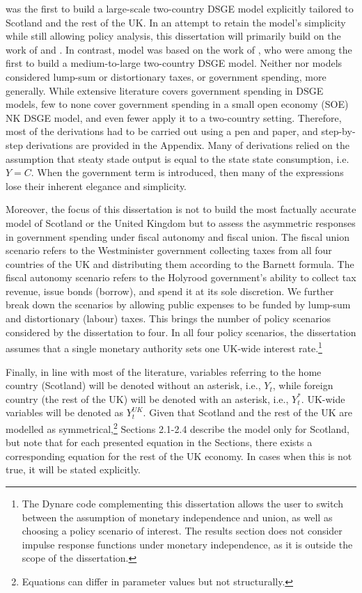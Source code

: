 \textcite{ricci_2019_essays} was the first to build a large-scale two-country DSGE model explicitly tailored to Scotland and the rest of the UK. In an attempt to retain the model's simplicity while still allowing policy analysis, this dissertation will primarily build on the work of \textcite{gali_2005_monetary} and \textcite{jordigal_2015_monetary}. In contrast, \textcite{ricci_2019_essays} model was based on the work of \textcite{rabanal_2010_eurodollar}, who were among the first to build a medium-to-large two-country DSGE model. Neither \textcite{gali_2005_monetary} nor \textcite{jordigal_2015_monetary} models considered lump-sum or distortionary taxes, or government spending, more generally. While extensive literature covers government spending in DSGE models, few to none cover government spending in a small open economy (SOE) NK DSGE model, and even fewer apply it to a two-country setting. Therefore, most of the derivations had to be carried out using a pen and paper, and step-by-step derivations are provided in the Appendix. Many of \textcite{jordigal_2015_monetary} derivations relied on the assumption that steaty stade output is equal to the state state consumption, i.e. $Y=C$. When the government term is introduced, then many of the expressions lose their inherent elegance and simplicity.

Moreover, the focus of this dissertation is not to build the most factually accurate model of Scotland or the United Kingdom but to assess the asymmetric responses in government spending under fiscal autonomy and fiscal union. The fiscal union scenario refers to the Westminister government collecting taxes from all four countries of the UK and distributing them according to the Barnett formula. The fiscal autonomy scenario refers to the Holyrood government's ability to collect tax revenue, issue bonds (borrow), and spend it at its sole discretion. We further break down the scenarios by allowing public expenses to be funded by lump-sum and distortionary (labour) taxes. This brings the number of policy scenarios considered by the dissertation to four. In all four policy scenarios, the dissertation assumes that a single monetary authority sets one UK-wide interest rate.\footnote{The Dynare code complementing this dissertation allows the user to switch between the assumption of monetary independence and union, as well as choosing a policy scenario of interest. The results section does not consider impulse response functions under monetary independence, as it is outside the scope of the dissertation.}

Finally, in line with most of the literature, variables referring to the home country (Scotland) will be denoted without an asterisk, i.e., $Y_t$, while foreign country (the rest of the UK) will be denoted with an asterisk, i.e., $Y^*_t$. UK-wide variables will be denoted as $Y_t^{UK}$. Given that Scotland and the rest of the UK are modelled as symmetrical,\footnote{Equations can differ in parameter values but not structurally.} Sections 2.1-2.4 describe the model only for Scotland, but note that for each presented equation in the Sections, there exists a corresponding equation for the rest of the UK economy. In cases when this is not true, it will be stated explicitly.